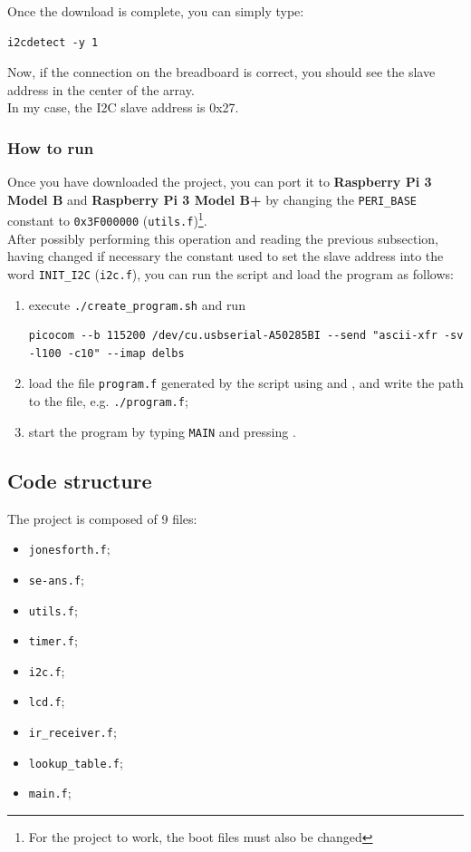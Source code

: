 \documentclass[a4paper, 12pt]{article}
\begin{document}
Once the download is complete, you can simply type:
\begin{Verbatim}[breaklines=true, breakanywhere=true]
    i2cdetect -y 1 
\end{Verbatim}
Now, if the connection on the breadboard is correct, you should see the slave address in the center of the array. \\
In my case, the I2C slave address is 0x27.

\subsubsection{How to run}

Once you have downloaded the project, you can port it to \textbf{Raspberry Pi 3 Model B} and \textbf{Raspberry Pi 3 Model B+} by changing the \texttt{PERI\_BASE} constant to \texttt{0x3F000000} (\texttt{utils.f})\footnote{For the project to work, the boot files must also be changed}. \\
After possibly performing this operation and reading the previous subsection, having changed if necessary the constant used to set the slave address into the word \texttt{INIT\_I2C} (\texttt{i2c.f}), you can run the script and load the program as follows:
\begin{enumerate}
    \item execute \texttt{./create\_program.sh} and run 
        \begin{Verbatim}[breaklines=true, breakanywhere=true]
        picocom --b 115200 /dev/cu.usbserial-A50285BI --send "ascii-xfr -sv -l100 -c10" --imap delbs
        \end{Verbatim}
    \item load the file \texttt{program.f} generated by the script using  and , and write the path to the file, e.g. \texttt{./program.f};
    \item start the program by typing \texttt{MAIN} and pressing \keys{\return}.
\end{enumerate}

\subsection{Code structure}

The project is composed of 9 files:
\begin{itemize}
    \item \texttt{jonesforth.f};
    \item \texttt{se-ans.f};
    \item \texttt{utils.f};
    \item \texttt{timer.f};
    \item \texttt{i2c.f};
    \item \texttt{lcd.f};
    \item \texttt{ir\_receiver.f};
    \item \texttt{lookup\_table.f};
    \item \texttt{main.f};
\end{itemize}
\end{document}
